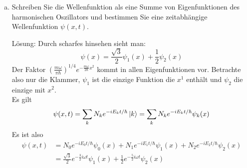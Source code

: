 \documentclass{scrartcl}
\begin{document}
\begin{enumerate}[a)]
\item Schreiben Sie die Wellenfunktion als eine Summe von Eigenfunktionen des harmonischen Oszillators und bestimmen Sie eine zeitabhängige Wellenfunktion $\psi(x,t)$.
\item[Lösung:]
Durch scharfes hinsehen sieht man:
\[\psi(x)=\frac{\sqrt 3}{2}\psi_1(x)+\frac{1}{2}\psi_2(x)\]
Der Faktor $\left(\frac{m\omega}{\pi\hbar}\right)^{1/4}e^{-\frac{m\omega}{2\hbar}x^2}$ kommt in allen Eigenfunktionen vor. Betrachte also nur die Klammer, $\psi_1$ ist die einzige Funktion die $x^1$ enthält und $\psi_2$ die einzige mit $x^2$.\\
Es gilt
\[\psi(x,t)=\sum_k N_k e^{-iE_k t/\hbar}\ket{k}=\sum_k N_k e^{-iE_k t /\hbar}\psi_k(x)\]
Es ist also
\begin{align*}
\psi(x,t)	&=N_0 e^{-iE_0 t/\hbar}\psi_0(x) + N_1 e^{-iE_1 t/\hbar}\psi_1(x) + N_2 e^{-iE_2 t/\hbar}\psi_2(x) \\
&= \frac{\sqrt 3}{2} e^{-\frac{3}{2}i\omega t}\psi_1(x) + \frac{1}{2} e^{-\frac{5}{2}i\omega t}\psi_2(x) \\
\end{align*}


\end{enumerate}
\end{document}
